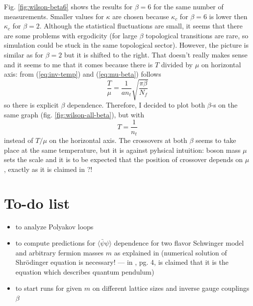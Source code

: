 \documentclass[12pt,a4paper]{article}
\begin{document}
Fig. \ref{fig:wilson-beta6} shows the results for $\beta =6$ for the same number of measurements. Smaller values for $\kappa$ are chosen because $\kappa_c$ for $\beta = 6$ is lower then $\kappa_c$ for $\beta = 2$. Although the statistical fluctuations are small, it seems that there are some problems with ergodicity (for large $\beta$ topological transitions are rare, so simulation could be stuck in the same topological sector). However, the picture is similar as for $\beta = 2$ but it is shifted to the right. That doesn't really makes sense and it seems to me that it comes because there is $T$ divided by $\mu$ on horizontal axis: from (\ref{eq:inv-temp}) and (\ref{eq:mu-beta}) follows
\begin{equation}
  \frac{T}{\mu} = \frac{1}{a n_t} \sqrt{\frac{\pi \beta}{N_{\!f}}} 
\end{equation}
so there is explicit $\beta$ dependence. Therefore, I decided to plot both $\beta$-s on the same graph (fig. \ref{fig:wilson-all-beta}), but with
\begin{equation}
  T = \frac{1}{n_t}
\end{equation}
instead of $T/\mu$ on the horizontal axis. The crossovers at both $\beta$ seems to take place at the same temperature, but it is against pyhsical intuition: boson mass $\mu$ sets the scale and it is to be expected that the position of crossover depends on $\mu$, exactly as it is claimed in \cite{Hetrick:1995yx,Hosotani:1995gn}?!

\section{To-do list}

\begin{itemize}
  \item to analyze Polyakov loops
  \item to compute predictions for $\langle\bar{\psi}\psi\rangle$ dependence for two flavor Schwinger model and arbitrary fermion masses $m$ as explained in \cite{Hetrick:1995yx,Hosotani:1995gn,Hosotani:1995zg} (numerical solution of Shr\"odinger equation is necessary! --- in \cite{Hosotani:1995zg}, pg. 4, is claimed that it is the equation which describes quantum pendulum)
  \item to start runs for given $m$ on different lattice sizes and inverse gauge couplings $\beta$
\end{itemize}
\end{document}
